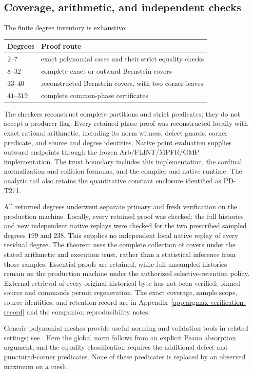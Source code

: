 \subsection{Coverage, arithmetic, and independent checks}

The finite degree inventory is exhaustive:
\begin{center}
\begin{tabular}{ll}
\hline
Degrees & Proof route\\
\hline
$2$--$7$ & exact polynomial cases and their strict equality checks\\
$8$--$32$ & complete exact or outward Bernstein covers\\
$33$--$40$ & reconstructed Bernstein covers, with two corner leaves\\
$41$--$319$ & complete common-phase certificates\\
\hline
\end{tabular}
\end{center}
The checkers reconstruct complete partitions and strict predicates;
they do not accept a producer flag.  Every retained phase proof was
reconstructed locally with exact rational arithmetic, including its
norm witness, defect guards, corner predicate, and source and degree
identities.  Native point evaluation supplies outward endpoints through
the frozen Arb/FLINT/MPFR/GMP implementation.  The trust boundary
includes this implementation, the cardinal normalization and collision
formulas, and the compiler and native runtime.  The analytic tail also
retains the quantitative constant enclosure identified as PD-T271.

All returned degrees underwent separate primary and fresh verification
on the production machine.  Locally, every retained proof was checked;
the full histories and new independent native replays were checked for
the two prescribed sampled degrees $199$ and $238$.  This supplies no
independent local native replay of every residual degree.  The theorem
uses the complete collection of covers under the stated arithmetic and
execution trust, rather than a statistical inference from those samples.
Essential proofs are retained, while full unsampled histories remain on
the production machine under the authorized selective-retention policy.
External retrieval of every original historical byte has not been
verified; pinned source and commands permit regeneration.  The exact
coverage, sample scope, source identities, and retention record are in
Appendix~\ref{app:argmax-verification-record} and the companion
reproducibility notes.

Generic polynomial meshes provide useful norming and validation tools
in related settings; see \cite{Mesh2024}.  Here the global norm follows
from an explicit Peano absorption argument, and the equality
classification requires the additional defect and punctured-corner
predicates.  None of these predicates is replaced by an observed
maximum on a mesh.
